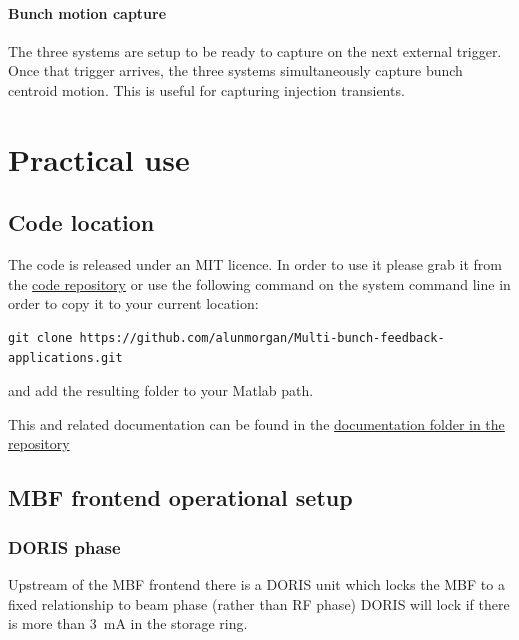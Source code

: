 \documentclass{report}
\begin{document}
\subsubsection{Bunch motion capture}
The three systems are setup to be ready to capture on the next external trigger. Once that trigger arrives, the three systems simultaneously capture bunch centroid motion. This is useful for capturing injection transients. 

\chapter{Practical use}
\section{Code location }
The code is released under an MIT licence. In order to use it please grab it from the \href{https://github.com/alunmorgan/Multi-bunch-feedback-applications}{code repository}
or use the following command on the system command line in order to copy it to your current location:
\begin{verbatim}
git clone https://github.com/alunmorgan/Multi-bunch-feedback-applications.git
\end{verbatim}
and add the resulting folder to your Matlab path. 

This and related documentation can be found in the \href{https://github.com/alunmorgan/Multi-bunch-feedback-applications/Documentation}{documentation folder in the repository}

 \section{MBF frontend operational setup}
\subsection{DORIS phase}
Upstream of the MBF frontend there is a DORIS unit which locks the MBF to a fixed relationship to beam phase (rather than RF phase) 
DORIS will lock if there is more than 3~mA in the storage ring.
\end{document}
